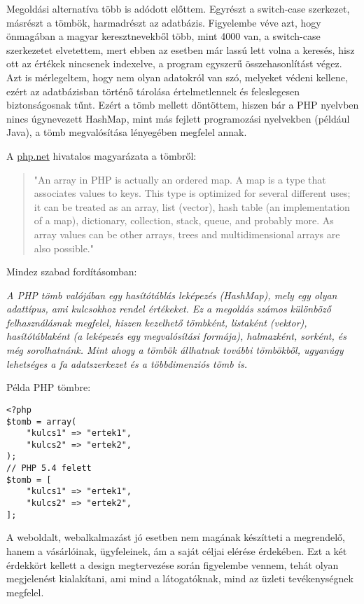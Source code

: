 Megoldási alternatíva több is adódott előttem. Egyrészt a switch-case szerkezet, másrészt a tömbök, harmadrészt az adatbázis. Figyelembe véve azt, hogy önmagában a magyar keresztnevekből több, mint 4000 van, a switch-case szerkezetet elvetettem, mert ebben az esetben már lassú lett volna a keresés, hisz ott az értékek nincsenek indexelve, a program egyszerű összehasonlítást végez. Azt is mérlegeltem, hogy nem olyan adatokról van szó, melyeket védeni kellene, ezért az adatbázisban történő tárolása értelmetlennek és feleslegesen biztonságosnak tűnt. Ezért a tömb mellett döntöttem, hiszen bár a PHP nyelvben nincs úgynevezett HashMap, mint más fejlett programozási nyelvekben (például Java), a tömb megvalósítása lényegében megfelel annak.


A \href{http://php.net/manual/en/language.types.array.php}{php.net} hivatalos magyarázata a tömbről:

\begin{quote}
"An array in PHP is actually an ordered map. A map is a type that associates values to keys. This type is optimized for several different uses; it can be treated as an array, list (vector), hash table (an implementation of a map), dictionary, collection, stack, queue, and probably more. As array values can be other arrays, trees and multidimensional arrays are also possible."
\end{quote}

Mindez szabad fordításomban:

\textit{A PHP tömb valójában egy hasítótáblás leképezés (HashMap), mely egy olyan adattípus, ami kulcsokhoz rendel értékeket. Ez a megoldás számos különböző felhasználásnak megfelel, hiszen kezelhető tömbként, listaként (vektor), hasítótáblaként (a leképezés egy megvalósítási formája), halmazként, sorként, és még sorolhatnánk. Mint ahogy a tömbök állhatnak további tömbökből, ugyanúgy lehetséges a fa adatszerkezet és a többdimenziós tömb is.}

\newpage

Példa PHP tömbre:
\begin{lstlisting}
<?php
$tomb = array(
	"kulcs1" => "ertek1",
	"kulcs2" => "ertek2",
);
// PHP 5.4 felett
$tomb = [
	"kulcs1" => "ertek1",
	"kulcs2" => "ertek2",
];
\end{lstlisting}


A weboldalt, webalkalmazást jó esetben nem magának készítteti a megrendelő, hanem a vásárlóinak, ügyfeleinek, ám a saját céljai elérése érdekében. Ezt a két érdekkört kellett a design megtervezése során figyelembe vennem, tehát olyan megjelenést kialakítani, ami mind a látogatóknak, mind az üzleti tevékenységnek megfelel.

